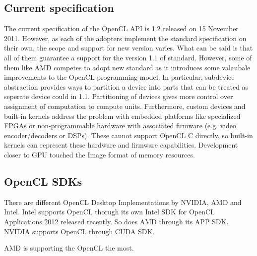 

\subsection{Current specification}
The current specification of the OpenCL API is 1.2 released on 15 November 2011. However, as each of the adopters implement the standard specification on their own, the scope and support for new version varies. What can be said is that all of them guarantee a support for the version 1.1 of standard. However, some of them like AMD competes to adopt new standard as it introduces some valaubale improvements to the OpenCL programming model. In particular, subdevice abstraction provides ways to partition a device into parts that can be treated as seperate device could in 1.1. Partitioning of devices gives more control over assignment of computation to compute units. Furthermore, custom devices and built-in kernels address the problem with embedded platforms like specialized FPGAs or non-programmable hardware with associated firmware (e.g. video encoder/decoders or DSPs). These cannot support OpenCL C directly, so built-in kernels can represent these hardware and firmware capabilities. Development closer to GPU touched the Image format of memory resources.




\subsection{OpenCL SDKs}
There are different OpenCL Desktop Implementations by NVIDIA, AMD and Intel. Intel supports OpenCL thorugh its own Intel SDK for OpenCL Applications 2012 released recently. So does AMD through its APP SDK. NVIDIA supports OpenCL through CUDA SDK.

AMD is supporting the OpenCL the most.



